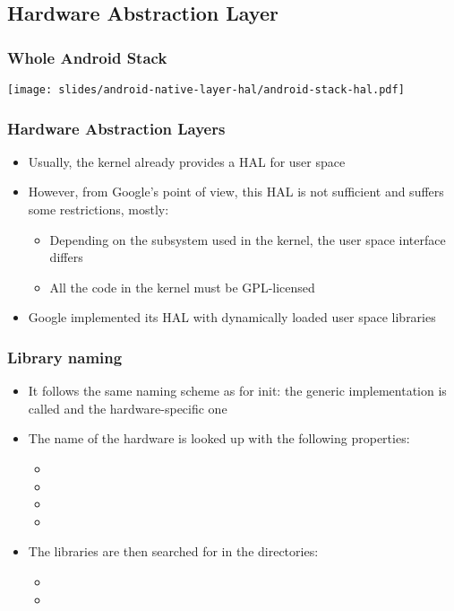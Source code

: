 \subsection{Hardware Abstraction Layer}

\begin{frame}
  \frametitle{Whole Android Stack}
  \begin{center}
    \texttt{[image: slides/android-native-layer-hal/android-stack-hal.pdf]}
  \end{center}
\end{frame}

\begin{frame}
  \frametitle{Hardware Abstraction Layers}
  \begin{itemize}
  \item Usually, the kernel already provides a HAL for user space
  \item However, from Google's point of view, this HAL is not sufficient and
    suffers some restrictions, mostly:
    \begin{itemize}
    \item Depending on the subsystem used in the kernel, the user space
      interface differs
    \item All the code in the kernel must be GPL-licensed
    \end{itemize}
  \item Google implemented its HAL with dynamically loaded user space libraries
  \end{itemize}
\end{frame}

\begin{frame}
  \frametitle{Library naming}
  \begin{itemize}
  \item It follows the same naming scheme as for init: the generic
    implementation is called  and the hardware-specific
    one 
  \item The name of the hardware is looked up with the following properties:
    \begin{itemize}
    \item {}
    \item {}
    \item {}
    \item {}
    \end{itemize}
  \item The libraries are then searched for in the directories:
    \begin{itemize}
    \item {}
    \item {}
    \end{itemize}
  \end{itemize}
\end{frame}

